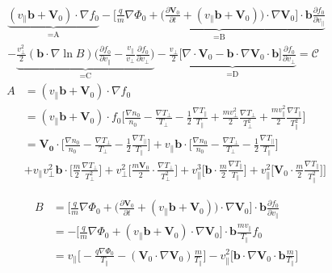 \begin{equation}
\begin{split}
    \underbrace{(v_\parallel \bm{b}+\bm{V}_0) \cdot \nabla f_0}_{\text{=A}}-\underbrace{\Bigg[\frac{q}{m}\nabla\Phi_0 + \Big(\frac{\partial \bm{V}_0}{\partial t} + (v_\parallel \bm{b} + \bm{V}_0)\Big)\cdot \nabla \bm{V}_0 \Bigg] \cdot \bm{b} \frac{\partial f_0}{\partial v_\parallel}}_\text{=B} \\
     -\underbrace{\frac{v_\perp^2}{2}(\bm{b} \cdot \nabla \ln{B}) \Big(\frac{\partial f_0}{\partial v_\parallel} - \frac{v_\parallel}{v_\perp} \frac{\partial f_0}{\partial v_\perp}\Big)}_{\text{=C}} - \underbrace{\frac{v_\perp}{2}\big[\nabla \cdot \bm{V}_0 - \bm{b} \cdot \nabla \bm{V}_0 \cdot \bm{b}\big]\frac{\partial f_0}{\partial v_\perp}}_{\text{=D}} = \mathcal{C} 
\end{split}
\end{equation}
\begin{equation}
    \begin{split}
        A &= (v_\parallel \bm{b}+\bm{V}_0) \cdot \nabla f_0 \\
        &=(v_\parallel \bm{b}+\bm{V}_0) \cdot f_0 \Big [ \frac{\nabla n_0}{n_0} - \frac{\nabla T_\perp}{T_\perp} - \frac{1}{2}\frac{\nabla T_\parallel}{T_\parallel} + \frac{mv_\perp^2}{2} \frac{\nabla T_\perp}{T_\perp^2} + \frac{m v_\parallel^2}{2} \frac{\nabla T_\parallel}{T_\parallel^2} \Big]\\
        &= \bm{V_0} \cdot \Big [ \frac{\nabla n_0}{n_0} - \frac{\nabla T_\perp}{T_\perp} - \frac{1}{2}\frac{\nabla T_\parallel}{T_\parallel} \Big] + v_\parallel \bm{b} \cdot \Big [ \frac{\nabla n_0}{n_0} - \frac{\nabla T_\perp}{T_\perp} - \frac{1}{2}\frac{\nabla T_\parallel}{T_\parallel}\Big] \\
        &+ v_\parallel v_\perp^2 \bm{b} \cdot \Big[\frac{m}{2}\frac{\nabla T_\perp}{T_\perp^2}\Big] + v_\perp^2 \Big[ \frac{m\bm{V}_0}{2} \cdot \frac{\nabla T_\perp}{T_\perp^2}\Big] + v_\parallel^3 \Big[\bm{b} \cdot \frac{m}{2}\frac{\nabla T_\parallel}{T_\parallel}\Big] + v_\parallel^2 \big[\bm{V}_0 \cdot \frac{m}{2}\frac{\nabla T_\parallel}{T_\parallel^2}\big]\Big]
    \label{FP_A}
    \end{split}
\end{equation}

\begin{equation}
    \begin{split}
        B&=\Bigg[\frac{q}{m}\nabla\Phi_0 + \Big(\frac{\partial \bm{V}_0}{\partial t} + (v_\parallel \bm{b} + \bm{V}_0)\Big)\cdot \nabla \bm{V}_0 \Bigg] \cdot \bm{b} \frac{\partial f_0}{\partial v_\parallel} \\
        &= -\Bigg[\frac{q}{m}\nabla\Phi_0 + (v_\parallel \bm{b} + \bm{V}_0)\cdot \nabla \bm{V}_0 \Bigg] \cdot \bm{b}  \frac{mv_\parallel}{T_\parallel}f_0 \\
        & = v_\parallel \Big[-\frac{q\nabla \Phi_0}{T_\parallel} -(\bm{V}_0 \cdot \nabla \bm{V}_0) \frac{m}{T_\parallel}\Big] - v_\parallel^2 \Big[\bm{b} \cdot \nabla \bm{V}_0 \cdot \bm{b} \frac{m}{T_\parallel}\Big]
    \label{FP_B}    
    \end{split}
\end{equation}


